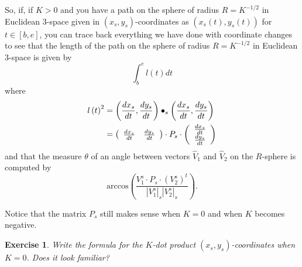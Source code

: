 \documentclass{article}%
\newtheorem{exercise}[theorem]{Exercise}
\begin{document}
So, if, if $K>0$ and you have a path on the sphere of radius $R=K^{-1/2}$ in
Euclidean $3$-space given in $\left(  x_{s},y_{s}\right)  $-coordinates as
$\left(  x_{s}\left(  t\right)  ,y_{s}\left(  t\right)  \right)  $ for
$t\in\left[  b,e\right]  $, you can trace back everything we have done with
coordinate changes to see that the length of the path on the sphere of radius
$R=K^{-1/2}$ in Euclidean $3$-space is given by%
\[%
{\displaystyle\int\nolimits_{b}^{e}}
l\left(  t\right)  dt
\]
where%
\begin{align*}
l\left(  t\right)  ^{2}  &  =\left(  \frac{dx_{s}}{dt},\frac{dy_{s}}%
{dt}\right)  \bullet_{s}\left(  \frac{dx_{s}}{dt},\frac{dy_{s}}{dt}\right) \\
&  =\left(
\begin{array}
[c]{cc}%
\frac{dx_{s}}{dt} & \frac{dy_{s}}{dt}%
\end{array}
\right)  \cdot P_{s}\cdot\left(
\begin{array}
[c]{c}%
\frac{dx_{s}}{dt}\\
\frac{dy_{s}}{dt}%
\end{array}
\right)
\end{align*}
and that the measure $\theta$ of an angle between vectors $\hat{V}_{1}$ and
$\hat{V}_{2}$ on the $R$-sphere is computed by%
\[
\mathrm{arccos}\left(  \frac{V_{1}^{s}\cdot P_{s}\cdot\left(  V_{2}%
^{s}\right)  ^{t}}{\left\vert V_{1}^{s}\right\vert _{s}\left\vert V_{2}%
^{s}\right\vert _{s}}\right)  .
\]


Notice that the matrix $P_{s}$ still makes sense when $K=0$ and when $K$
becomes negative.

\begin{exercise}
Write the formula for the $K$-dot product $\left(  x_{s},y_{s}\right)
$-coordinates when $K=0$. Does it look familiar?
\end{exercise}
\end{document}
